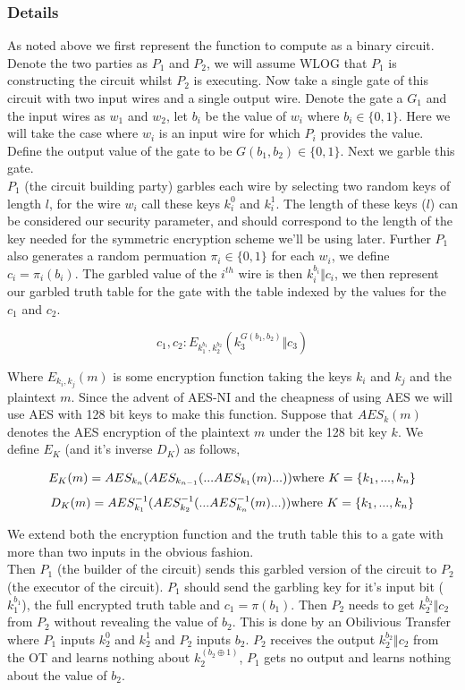 \documentclass[a4paper,10pt]{article}
\begin{document}
	\subsubsection{Details} \label{Yao_Details}
		As noted above we first represent the function to compute as a binary circuit. Denote the two parties as $P_1$ and $P_2$, we will assume WLOG that $P_1$ is constructing the circuit whilst $P_2$ is executing. Now take a single gate of this circuit with two input wires and a single output wire. Denote the gate a $G_1$ and the input wires as $w_1$ and $w_2$, let $b_i$ be the value of $w_i$ where $b_i \in \{0, 1\}$. Here we will take the case where $w_i$ is an input wire for which $P_i$ provides the value. Define the output value of the gate to be $G(b_1, b_2) \in \{0, 1\}$. Next we garble this gate.\\

		$P_1$ (the circuit building party) garbles each wire by selecting two random keys of length $l$, for the wire $w_i$ call these keys $k_i^0$ and $k_i^1$. The length of these keys ($l$) can be considered our security parameter, and should correspond to the length of the key needed for the symmetric encryption scheme we'll be using later. Further $P_1$ also generates a random permuation $\pi_i \in \{0, 1\}$ for each $w_i$, we define $c_i = \pi_i(b_i)$. The garbled value of the $i^{th}$ wire is then $k_i^{b_i} \Vert c_i$, we then represent our garbled truth table for the gate with the table indexed by the values for the $c_1$ and $c_2$.

		$$ c_1, c_2 : E_{k_1^{b_1}, k_2^{b_2}} (k_3^{ G(b_1, b_2) } \Vert c_3) $$

		Where $E_{k_i, k_j}(m)$ is some encryption function taking the keys $k_i$ and $k_j$ and the plaintext $m$. Since the advent of AES-NI and the cheapness of using AES we will use AES with 128 bit keys to make this function. Suppose that $AES_k(m)$ denotes the AES encryption of the plaintext $m$ under the 128 bit key $k$. We define $E_K$ (and it's inverse $D_K$)  as follows,

		$$ E_K(m) = AES_{k_n}( AES_{k_{n-1}}( ...AES_{k_1}(m) ...) ) \textnormal{where } K = \{k_1, ..., k_n\}$$ 
		$$ D_K(m) = AES^{-1}_{k_1}( AES^{-1}_{k_{2}}( ...AES^{-1}_{k_n}(m) ...) ) \textnormal{where } K = \{k_1, ..., k_n\}$$ 

		We extend both the encryption function and the truth table this to a gate with more than two inputs in the obvious fashion.\\

		Then $P_1$ (the builder of the circuit) sends this garbled version of the circuit to $P_2$ (the executor of the circuit). $P_1$ should send the garbling key for it's input bit ($k_1^{b_1}$), the full encrypted truth table and $c_1 = \pi(b_1)$. Then $P_2$ needs to get $k_2^{b_2} \Vert c_2$ from $P_2$ without revealing the value of $b_2$. This is done by an Obilivious Transfer where $P_1$ inputs $k_2^0$ and $k_2^1$ and $P_2$ inputs $b_2$. $P_2$ receives the output $k_2^{b_2} \Vert c_2$ from the OT and learns nothing about $k_2^{(b_2 \oplus 1)} $, $P_1$ gets no output and learns nothing about the value of $b_2$.\\
\end{document}
